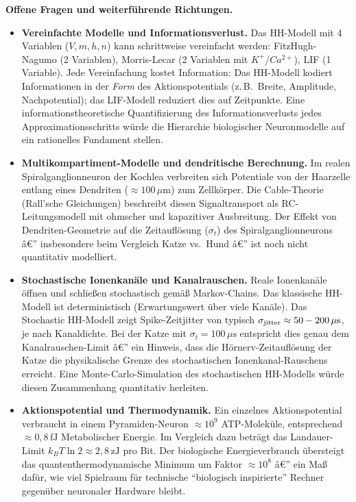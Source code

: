 ﻿\documentclass[12pt,a4paper,titlepage]{report}
\begin{document}
\textbf{Offene Fragen und weiterführende Richtungen.}
\begin{itemize}[leftmargin=2em]
  \item \textbf{Vereinfachte Modelle und Informationsverlust.}
    Das HH-Modell mit 4 Variablen ($V, m, h, n$) kann schrittweise
    vereinfacht werden: FitzHugh-Nagumo (2 Variablen),
    Morris-Lecar (2 Variablen mit $K^+$/$Ca^{2+}$),
    LIF (1 Variable).
    Jede Vereinfachung kostet Information:
    Das HH-Modell kodiert Informationen in der \emph{Form}
    des Aktionspotentials (z.\,B.\ Breite, Amplitude, Nachpotential);
    das LIF-Modell reduziert dies auf Zeitpunkte.
    Eine informationstheoretische Quantifizierung des
    Informationsverlusts jedes Approximationsschritts würde
    die Hierarchie biologischer Neuronmodelle auf ein
    rationelles Fundament stellen.
  \item \textbf{Multikompartiment-Modelle und dendritische Berechnung.}
    Im realen Spiralganglionneuron der Kochlea verbreiten sich
    Potentiale von der Haarzelle entlang eines Dendriten
    ($\approx 100\,\mu\mathrm{m}$) zum Zellkörper.
    Die Cable-Theorie (Rall'sche Gleichungen) beschreibt diesen
    Signaltransport als RC-Leitungsmodell mit ohmscher und
    kapazitiver Ausbreitung.
    Der Effekt von Dendriten-Geometrie auf die Zeitauflösung
    ($\sigma_t$) des Spiralganglionneurons â€” insbesondere
    beim Vergleich Katze vs.\ Hund â€” ist noch nicht quantitativ modelliert.
  \item \textbf{Stochastische Ionenkanäle und Kanalrauschen.}
    Reale Ionenkanäle öffnen und schließen stochastisch
    gemäß Markov-Chains.
    Das klassische HH-Modell ist deterministisch (Erwartungswert
    über viele Kanäle).
    Das Stochastic HH-Modell zeigt Spike-Zeitjitter
    von typisch $\sigma_{\rm jitter} \approx 50-200\,\mu\mathrm{s}$,
    je nach Kanaldichte.
    Bei der Katze mit $\sigma_t = 100\,\mu\mathrm{s}$ entspricht
    dies genau dem Kanalrauschen-Limit â€”
    ein Hinweis, dass die Hörnerv-Zeitauflösung der Katze die
    physikalische Grenze des stochastischen Ionenkanal-Rauschens
    erreicht.
    Eine Monte-Carlo-Simulation des stochastischen HH-Modells
    würde diesen Zusammenhang quantitativ herleiten.
  \item \textbf{Aktionspotential und Thermodynamik.}
    Ein einzelnes Aktionspotential verbraucht in einem
    Pyramiden-Neuron $\approx 10^9$ ATP-Moleküle,
    entsprechend $\approx 0{,}8\,\mathrm{fJ}$ Metabolischer Energie.
    Im Vergleich dazu beträgt das Landauer-Limit $k_BT\ln2 \approx 2{,}8\,\mathrm{zJ}$
    pro Bit.
    Der biologische Energieverbrauch übersteigt das quantenthermodynamische
    Minimum um Faktor $\approx 10^8$ â€”
    ein Maß dafür, wie viel Spielraum für technische ``biologisch inspirierte''
    Rechner gegenüber neuronaler Hardware bleibt.
\end{itemize}
\end{document}
